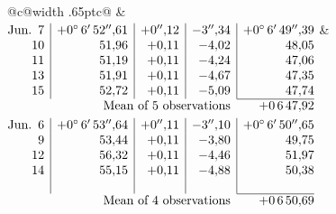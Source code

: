 \noindent\begin{tabular}{@{}c@{\hspace{.4em}\vrule width .65pt\hspace{.4em}}c@{}}
 &
 \\[.18ex]
\(\begin{array}[t]{@{}r|r|r|r|r@{}}
\text{Jun.}\enspace 7 & +0^\circ\,6'\,52''{,}61 & +0''{,}12 & -3''{,}34 & +0^\circ\,6'\,49''{,}39\\
10 & 51{,}96 & +0{,}11 & -4{,}02 & 48{,}05\\
11 & 51{,}19 & +0{,}11 & -4{,}24 & 47{,}06\\
13 & 51{,}91 & +0{,}11 & -4{,}67 & 47{,}35\\
15 & 52{,}72 & +0{,}11 & -5{,}09 & 47{,}74\\
\cline{5-5}
\multicolumn{4}{r}{\text{Mean of 5 observations}} & +0\,6\,47{,}92
\end{array}\)
&
\(\begin{array}[t]{@{}r|r|r|r|r@{}}
\text{Jun.}\enspace 6 & +0^\circ\,6'\,53''{,}64 & +0''{,}11 & -3''{,}10 & +0^\circ\,6'\,50''{,}65\\
9 & 53{,}44 & +0{,}11 & -3{,}80 & 49{,}75\\
12 & 56{,}32 & +0{,}11 & -4{,}46 & 51{,}97\\
14 & 55{,}15 & +0{,}11 & -4{,}88 & 50{,}38\\
 & & & & \\
\cline{5-5}
\multicolumn{4}{r}{\text{Mean of 4 observations}} & +0\,6\,50{,}69
\end{array}\)
\end{tabular}\par\medskip
{}
